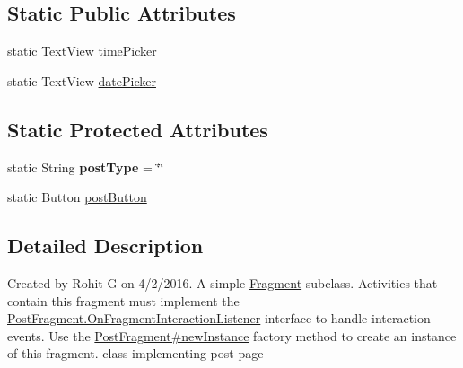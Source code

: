 \subsection*{Static Public Attributes}
\begin{DoxyCompactItemize}
\item 
static Text\-View \hyperlink{classcom_1_1example_1_1sel_1_1lostfound_1_1PostFragment_ac6d98a5b689bea76cf1248a20a54d23c}{time\-Picker}
\item 
static Text\-View \hyperlink{classcom_1_1example_1_1sel_1_1lostfound_1_1PostFragment_a1c187b07da5262cf568439018a826ef9}{date\-Picker}
\end{DoxyCompactItemize}
\subsection*{Static Protected Attributes}
\begin{DoxyCompactItemize}
\item 
\hypertarget{classcom_1_1example_1_1sel_1_1lostfound_1_1PostFragment_acb0672afa2382233136ee251bef7149b}{static String {\bfseries post\-Type} = \char`\"{}\char`\"{}}\label{classcom_1_1example_1_1sel_1_1lostfound_1_1PostFragment_acb0672afa2382233136ee251bef7149b}

\item 
static Button \hyperlink{classcom_1_1example_1_1sel_1_1lostfound_1_1PostFragment_ab2d93225b515c22ccd209e1382e1a4a1}{post\-Button}
\end{DoxyCompactItemize}


\subsection{Detailed Description}
Created by Rohit G on 4/2/2016. A simple \hyperlink{}{Fragment} subclass. Activities that contain this fragment must implement the \hyperlink{interfacecom_1_1example_1_1sel_1_1lostfound_1_1PostFragment_1_1OnFragmentInteractionListener}{Post\-Fragment.\-On\-Fragment\-Interaction\-Listener} interface to handle interaction events. Use the \hyperlink{classcom_1_1example_1_1sel_1_1lostfound_1_1PostFragment_a7350f5b81aa9144d9acdeca902676773}{Post\-Fragment\#new\-Instance} factory method to create an instance of this fragment. class implementing post page 

